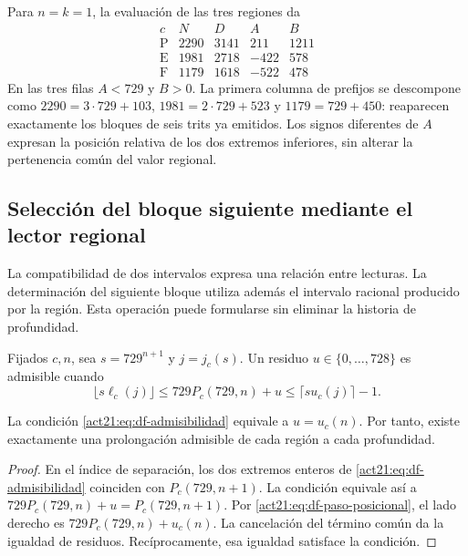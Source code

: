 \begin{example}
Para \(n=k=1\), la evaluación de las tres regiones da
\[
\begin{array}{c|rr|rr}
 c&N&D&A&B\\\hline
 \mathrm P&2290&3141&211&1211\\
 \mathrm E&1981&2718&-422&578\\
 \mathrm F&1179&1618&-522&478
\end{array}
\]
En las tres filas \(A<729\) y \(B>0\). La primera columna de prefijos
se descompone como \(2290=3\cdot729+103\),
\(1981=2\cdot729+523\) y \(1179=729+450\): reaparecen exactamente los
bloques de seis trits ya emitidos. Los signos diferentes de \(A\) expresan
la posición relativa de los dos extremos inferiores, sin alterar la
pertenencia común del valor regional.
\end{example}

\subsection{Selección del bloque siguiente mediante el lector regional}

La compatibilidad de dos intervalos expresa una relación entre lecturas.
La determinación del siguiente bloque utiliza además el intervalo racional
producido por la región. Esta operación puede formularse sin eliminar la
historia de profundidad.

\begin{definition}
Fijados \(c,n\), sea \(s=729^{n+1}\) y \(j=j_c(s)\). Un residuo
\(u\in\{0,\ldots,728\}\) es admisible cuando
\begin{equation}
 \lfloor s\ell_c(j)\rfloor
 \leq729P_c(729,n)+u
 \leq\lceil su_c(j)\rceil-1.
 \label{act21:eq:df-admisibilidad}
\end{equation}
\end{definition}

\begin{theorem}
\label{act21:thm:df-prolongacion-unica}
La condición \eqref{act21:eq:df-admisibilidad} equivale a \(u=u_c(n)\).
Por tanto, existe exactamente una prolongación admisible de cada región
a cada profundidad.
\end{theorem}

\begin{proof}
En el índice de separación, los dos extremos enteros de
\eqref{act21:eq:df-admisibilidad} coinciden con \(P_c(729,n+1)\).
La condición equivale así a
\(729P_c(729,n)+u=P_c(729,n+1)\).
Por \eqref{act21:eq:df-paso-posicional}, el lado derecho es
\(729P_c(729,n)+u_c(n)\). La cancelación del término común da la
igualdad de residuos. Recíprocamente, esa igualdad satisface la condición.
\end{proof}

